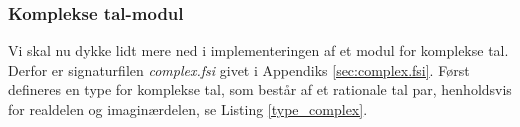 \documentclass{article}
\begin{document}







\subsubsection{Komplekse tal-modul}
Vi skal nu dykke lidt mere ned i implementeringen af et modul for komplekse tal. Derfor er signaturfilen \textit{complex.fsi} givet i Appendiks \ref{sec:complex.fsi}. Først defineres en type for komplekse tal, som består af et rationale tal par, henholdsvis for realdelen og imaginærdelen, se Listing \ref{type_complex}.
\end{document}
